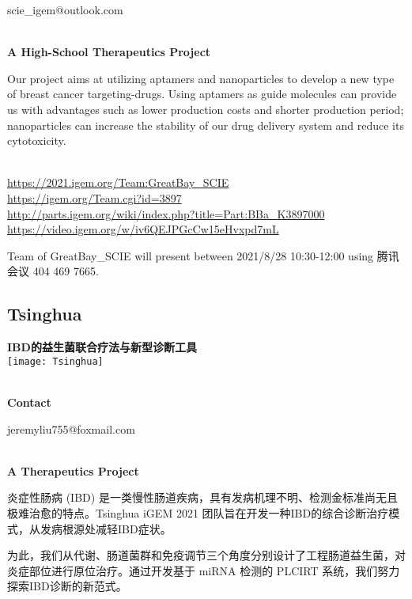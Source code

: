   scie\_igem@outlook.com


\textbf{\\A High-School Therapeutics Project\\}\begin{spacing}{1.5}

Our project aims at utilizing aptamers and nanoparticles to develop a new type of breast cancer targeting-drugs. Using aptamers as guide molecules can provide us with advantages such as lower production costs and shorter production period; nanoparticles can increase the stability of our drug delivery system and reduce its cytotoxicity.\end{spacing}
\\

\url{https://2021.igem.org/Team:GreatBay\_SCIE }\\
\url{https://igem.org/Team.cgi?id=3897 }\\
\url{http://parts.igem.org/wiki/index.php?title=Part:BBa_K3897000 }\\
\url{https://video.igem.org/w/iv6QEJPGcCw15eHvxpd7mL }\\

\vfill{}









Team of GreatBay\_SCIE will present between     2021/8/28 10:30-12:00    using 腾讯会议 404 469 7665.
\newpage


\subsection{\textcolor{Blu}{ Tsinghua } }
\vspace{5mm}
\begin{center}
\large{
  \textbf{ IBD的益生菌联合疗法与新型诊断工具 }\\
  \texttt{[image: Tsinghua]}
}
\end{center}
\textbf{\\Contact}

  jeremyliu755@foxmail.com


\textbf{\\A Therapeutics Project\\}\begin{spacing}{1.5}

炎症性肠病 (IBD) 是一类慢性肠道疾病，具有发病机理不明、检测金标准尚无且极难治愈的特点。Tsinghua iGEM 2021 团队旨在开发一种IBD的综合诊断治疗模式，从发病根源处减轻IBD症状。

为此，我们从代谢、肠道菌群和免疫调节三个角度分别设计了工程肠道益生菌，对炎症部位进行原位治疗。通过开发基于 miRNA 检测的 PLCIRT 系统，我们努力探索IBD诊断的新范式。\end{spacing}
\\

